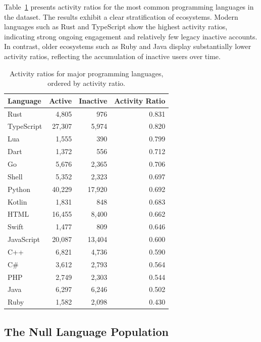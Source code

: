 \documentclass[12pt,a4paper]{article}
\begin{document}
Table~\ref{tab:language-activity} presents activity ratios for the most common programming languages in the dataset. The results exhibit a clear stratification of ecosystems. Modern languages such as Rust and TypeScript show the highest activity ratios, indicating strong ongoing engagement and relatively few legacy inactive accounts. In contrast, older ecosystems such as Ruby and Java display substantially lower activity ratios, reflecting the accumulation of inactive users over time.

\begin{table}[h]
\centering
\begin{tabular}{lrrr}
\toprule
Language & Active & Inactive & Activity Ratio \\
\midrule
Rust        & 4{,}805  &    976   & 0.831 \\
TypeScript  & 27{,}307 &  5{,}974 & 0.820 \\
Lua         & 1{,}555  &    390   & 0.799 \\
Dart        & 1{,}372  &    556   & 0.712 \\
Go          & 5{,}676  &  2{,}365 & 0.706 \\
Shell       & 5{,}352  &  2{,}323 & 0.697 \\
Python      & 40{,}229 & 17{,}920 & 0.692 \\
Kotlin      & 1{,}831  &    848   & 0.683 \\
HTML        & 16{,}455 &  8{,}400 & 0.662 \\
Swift       & 1{,}477  &    809   & 0.646 \\
JavaScript  & 20{,}087 & 13{,}404 & 0.600 \\
C++         & 6{,}821  &  4{,}736 & 0.590 \\
C\#         & 3{,}612  &  2{,}793 & 0.564 \\
PHP         & 2{,}749  &  2{,}303 & 0.544 \\
Java        & 6{,}297  &  6{,}246 & 0.502 \\
Ruby        & 1{,}582  &  2{,}098 & 0.430 \\
\bottomrule
\end{tabular}
\caption{Activity ratios for major programming languages, ordered by activity ratio.}
\label{tab:language-activity}
\end{table}

\subsection{The Null Language Population}
\end{document}
